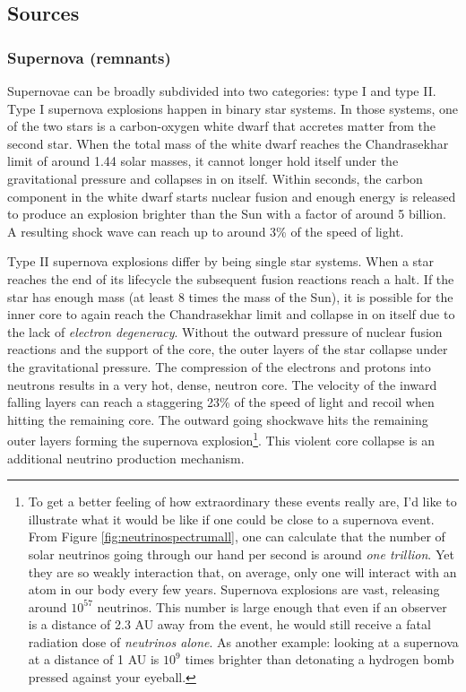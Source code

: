 \subsection{Sources}
\subsubsection{Supernova (remnants)}
\label{subsubsec:supernovae}
Supernovae can be broadly subdivided into two categories: type I and type II. Type I supernova explosions happen in binary star systems. In those systems, one of the two stars is a carbon-oxygen white dwarf that accretes matter from the second star. When the total mass of the white dwarf reaches the Chandrasekhar limit of around 1.44 solar masses, it cannot longer hold itself under the gravitational pressure and collapses in on itself. Within seconds, the carbon component in the white dwarf starts nuclear fusion and enough energy is released to produce an explosion brighter than the Sun with a factor of around 5 billion. 
A resulting shock wave can reach up to around 3\% of the speed of light.

Type II supernova explosions differ by being single star systems. When a star reaches the end of its lifecycle the subsequent fusion reactions reach a halt. If the star has enough mass (at least 8 times the mass of the Sun), it is possible for the inner core to again reach the Chandrasekhar limit and collapse in on itself due to the lack of \textit{electron degeneracy}. Without the outward pressure of nuclear fusion reactions and the support of the core, the outer layers of the star collapse under the gravitational pressure. The compression of the electrons and protons into neutrons results in a very hot, dense, neutron core. The velocity of the inward falling layers can reach a staggering 23\% of the speed of light and recoil when hitting the remaining core. The outward going shockwave hits the remaining outer layers forming the supernova explosion\footnote{To get a better feeling of how extraordinary these events really are, I'd like to illustrate what it would be like if one could be close to a supernova event. From Figure \ref{fig:neutrinospectrumall}, one can calculate that the number of solar neutrinos going through our hand per second is around \textit{one trillion}. Yet they are so weakly interaction that, on average, only one will interact with an atom in our body every few years. Supernova explosions are vast, releasing around $10^{57}$ neutrinos. This number is large enough that even if an observer is a distance of 2.3 AU away from the event, he would still receive a fatal radiation dose of \textit{neutrinos alone}. As another example: looking at a supernova at a distance of 1 AU is $10^9$ times brighter than detonating a hydrogen bomb pressed against your eyeball.}. This violent core collapse is an additional neutrino production mechanism.

